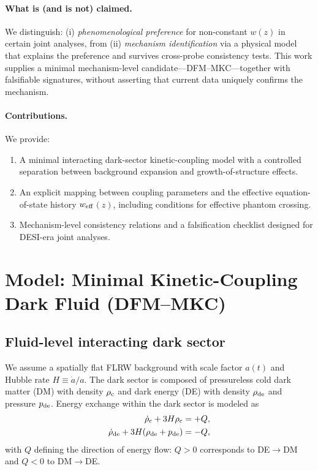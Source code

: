 \documentclass[reprint,aps,prd,nofootinbib,superscriptaddress]{revtex4-2}
\newcommand{\wz}{\ensuremath{w(z)}\xspace}
\newcommand{\weff}{\ensuremath{w_{\rm eff}}\xspace}
\begin{document}
\paragraph{What is (and is not) claimed.}
We distinguish: (i) \emph{phenomenological preference} for non-constant \wz in certain joint analyses, from (ii) \emph{mechanism identification} via a physical model that explains the preference and survives cross-probe consistency tests.
This work supplies a minimal mechanism-level candidate---DFM--MKC---together with falsifiable signatures,
without asserting that current data uniquely confirms the mechanism.

\paragraph{Contributions.}
We provide:
\begin{enumerate}
  \item A minimal interacting dark-sector kinetic-coupling model with a controlled separation between background expansion and growth-of-structure effects.
  \item An explicit mapping between coupling parameters and the effective equation-of-state history \weff$(z)$, including conditions for effective phantom crossing.
  \item Mechanism-level consistency relations and a falsification checklist designed for DESI-era joint analyses.
\end{enumerate}
\cite{DESI,Planck2018,PantheonPlus}

\section{Model: Minimal Kinetic-Coupling Dark Fluid (DFM--MKC)}
\label{sec:model}

\subsection{Fluid-level interacting dark sector}

We assume a spatially flat FLRW background with scale factor $a(t)$ and Hubble rate $H\equiv \dot a/a$.
The dark sector is composed of pressureless cold dark matter (DM) with density $\rho_{\rm c}$ and dark energy (DE) with density $\rho_{\rm de}$ and pressure $p_{\rm de}$.
Energy exchange within the dark sector is modeled as
\begin{align}
\dot\rho_{\rm c} + 3H\rho_{\rm c} &= +Q, \label{eq:dm_cont}\\
\dot\rho_{\rm de} + 3H(\rho_{\rm de}+p_{\rm de}) &= -Q, \label{eq:de_cont}
\end{align}
with $Q$ defining the direction of energy flow:
$Q>0$ corresponds to DE$\to$DM and $Q<0$ to DM$\to$DE.
\end{document}

